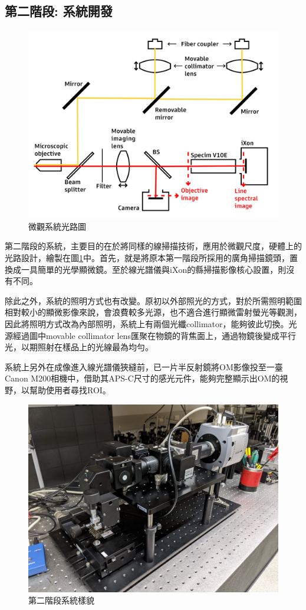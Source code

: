 \documentclass[12pt]{article}
\begin{document}
\subsection{第二階段: 系統開發}
\begin{figure}
    \centering
    \includegraphics[width = 0.9\linewidth]{lightPath2.jpg}
    \caption{微觀系統光路圖}
    \label{fig: micro path}
\end{figure}
第二階段的系統，主要目的在於將同樣的線掃描技術，應用於微觀尺度，硬體上的光路設計，繪製在圖\ref{fig: micro path}中。首先，就是將原本第一階段所採用的廣角掃描鏡頭，置換成一具簡單的光學顯微鏡。至於線光譜儀與iXon的縣掃描影像核心設置，則沒有不同。

除此之外，系統的照明方式也有改變。原初以外部照光的方式，對於所需照明範圍相對較小的顯微影像來說，會浪費較多光源，也不適合進行顯微雷射螢光等觀測，
因此將照明方式改為內部照明，系統上有兩個光纖collimator，能夠彼此切換。光源經過圖中movable collimator lens匯聚在物鏡的背焦面上，通過物鏡後變成平行光，以期照射在樣品上的光線最為均勻。

系統上另外在成像進入線光譜儀狹縫前，已一片半反射鏡將OM影像投至一臺Canon M200相機中，借助其APS-C尺寸的感光元件，能夠完整顯示出OM的視野，以幫助使用者尋找ROI。
\begin{figure}
    \centering
    \includegraphics[width=\linewidth]{microSystemPixel3.jpg}
    \caption{第二階段系統樣貌}
\end{figure}
\end{document}
